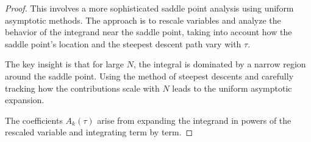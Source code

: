\documentclass{article}
\begin{document}
\begin{proof}
This involves a more sophisticated saddle point analysis using uniform asymptotic methods. The approach is to rescale variables and analyze the behavior of the integrand near the saddle point, taking into account how the saddle point's location and the steepest descent path vary with $\tau$.

The key insight is that for large $N$, the integral is dominated by a narrow region around the saddle point. Using the method of steepest descents and carefully tracking how the contributions scale with $N$ leads to the uniform asymptotic expansion.

The coefficients $A_k(\tau)$ arise from expanding the integrand in powers of the rescaled variable and integrating term by term.
\end{proof}
\end{document}
